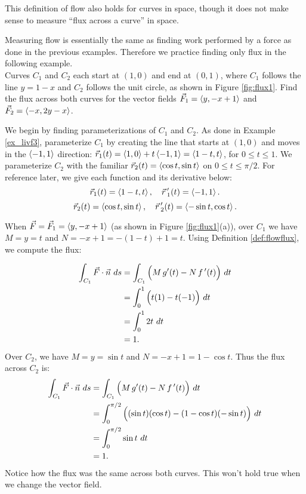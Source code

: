 This definition of flow also holds for curves in space, though it does not make sense to measure ``flux across a curve'' in space.

Measuring flow is essentially the same as finding work performed by a force as done in the previous examples. Therefore we practice finding only flux in the following example.\\

{Curves $C_1$ and $C_2$ each start at $(1,0)$ and end at $(0,1)$, where $C_1$ follows the line $y=1-x$ and $C_2$ follows the unit circle, as shown in Figure \ref{fig:flux1}. Find the flux across both curves for the vector fields $\vec F_1 = \left\langle y, -x+1\right\rangle$ and $\vec F_2 = \left\langle -x, 2y-x\right\rangle$. 
}
{%
We begin by finding parameterizations of $C_1$ and $C_2$. As done in Example \ref{ex_livf3}, parameterize $C_1$ by creating the line that starts at $(1,0)$ and moves in the $\left\langle -1,1\right\rangle$ direction: $\vec r_1(t) = \left\langle 1,0\right\rangle + t\left\langle -1,1\right\rangle = \left\langle 1-t, t\right\rangle$, for $0\leq t\leq 1$. We parameterize $C_2$ with the familiar $\vec r_2(t) = \left\langle \cos t,\sin t\right\rangle$ on $0\leq t\leq \pi/2$. For reference later, we give each function and its derivative below:
$$ \vec r_1(t) = \left\langle 1-t, t\right\rangle, \quad \vec r\, '_1(t) = \left\langle -1,1\right\rangle.$$
$$\vec r_2(t) = \left\langle \cos t, \sin t\right\rangle, \quad \vec r\, '_2(t) = \left\langle -\sin t ,\cos t\right\rangle.$$

When $\vec F = \vec F_1 = \left\langle y, -x+1\right\rangle$ (as shown in Figure \ref{fig:flux1}(a)), over $C_1$ we have $M = y =t$ and $N = -x+1 = -(1-t)+1 = t$. Using Definition \ref{def:flowflux}, we compute the flux:

\begin{align*}
\int_{C_1} \vec F\cdot \vec n\ ds & = \int_{C_1} \Big(M\,g'(t) - N\,f\,'(t)\Big)\ dt\\
			&= \int_0^1 \Big( t(1) - t(-1)\Big)\ dt \\
			&= \int_0^1 2t\ dt\\
			&= 1.
\end{align*}
Over $C_2$, we have $M = y = \sin t$ and $N = -x+1 = 1-\cos t$. Thus the flux across $C_2$ is:
\begin{align*}
\int_{C_1} \vec F\cdot \vec n\ ds & = \int_{C_1} \Big(M\,g'(t) - N\,f\,'(t)\Big)\ dt\\
				&= \int_0^{\pi/2}\Big((\sin t)(\cos t) - (1-\cos t)(-\sin t)\Big)\ dt\\
				&= \int_0^{\pi/2} \sin t\ dt\\
				&=1.
\end{align*}
Notice how the flux was the same across both curves. This won't hold true when we change the vector field.
\drawexampleline%

}
